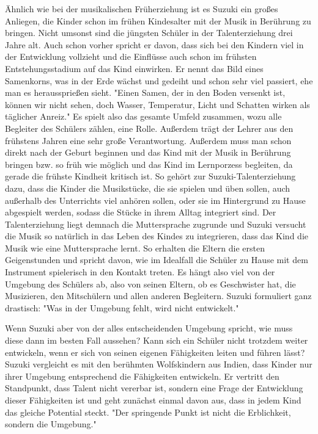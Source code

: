 Ähnlich wie bei der musikalischen Früherziehung ist es Suzuki ein großes Anliegen,
die Kinder schon im frühen Kindesalter mit der Musik in Berührung zu bringen.
Nicht umsonst sind die jüngsten Schüler in der Talenterziehung drei Jahre alt. Auch schon vorher
spricht er davon, dass sich bei den Kindern viel in der Entwicklung vollzieht
und die Einflüsse auch schon im frühsten Entstehungsstadium auf das Kind
einwirken. Er nennt das Bild eines Samenkorns, was in der Erde wächst und
gedeiht und schon sehr viel passiert, ehe man es heraussprießen sieht. "Einen Samen, der
in den Boden versenkt ist, können wir nicht sehen, doch Wasser, Temperatur,
Licht und Schatten wirken als täglicher Anreiz."\autocite[17]{suzuki:erziehung_ist_liebe}
Es spielt also das gesamte Umfeld zusammen, wozu alle Begleiter des Schülers
zählen, eine Rolle. Außerdem trägt der Lehrer aus den frühstens Jahren eine sehr
große Verantwortung. Außerdem muss man schon direkt nach der Geburt beginnen und das Kind mit
der Musik in Berührung bringen bzw. so früh wie
möglich und das Kind im Lernporzess begleiten, da gerade die frühste Kindheit
kritisch ist. \autocite[25]{suzuki:erziehung_ist_liebe}
So gehört zur Suzuki-Talenterziehung dazu, dass die Kinder die Musikstücke,
die sie spielen und üben sollen, auch außerhalb des Unterrichts viel anhören sollen, oder sie im Hintergrund zu Hause
abgespielt werden, sodass die Stücke in ihrem Alltag integriert sind.
Der Talenterziehung liegt demnach die Muttersprache zugrunde und Suzuki versucht
die Musik so natürlich in das Leben des Kindes zu integrieren, dass das Kind die
Musik wie eine Muttersprache lernt. So erhalten die Eltern die ersten
Geigenstunden und spricht davon, wie im Idealfall die Schüler zu Hause mit dem
Instrument spielerisch in den Kontakt treten. \autocite[75]{suzuki:erziehung_ist_liebe}
Es hängt also viel von der Umgebung des Schülers ab, also von seinen Eltern, ob
es Geschwister hat, die Musizieren, den Mitschülern und allen anderen Begleitern.
Suzuki formuliert ganz drastisch: "Was in der Umgebung fehlt, wird nicht entwickelt." \autocite[25]{suzuki:erziehung_ist_liebe}

Wenn Suzuki aber von der alles entscheidenden Umgebung spricht, wie muss diese
dann im besten Fall aussehen? Kann sich ein Schüler nicht trotzdem weiter
entwickeln, wenn er sich von seinen eigenen Fähigkeiten leiten und führen lässt?
Suzuki vergleicht es mit den berühmten Wolfskindern aus Indien, dass Kinder nur
ihrer Umgebung entsprechend die Fähigkeiten entwickeln. \autocite[24]{suzuki:erziehung_ist_liebe}
Er vertritt den Standpunkt, dass Talent nicht vererbar ist, sondern eine Frage
der Entwicklung dieser Fähigkeiten ist und geht zunächst einmal davon aus, dass
in jedem Kind das gleiche Potential steckt. "Der springende Punkt ist nicht die
Erblichkeit, sondern die Umgebung." \autocite[24]{suzuki:erziehung_ist_liebe}


